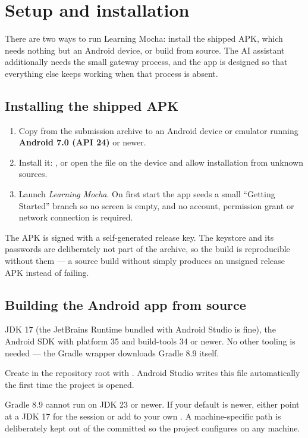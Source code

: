 \section{Setup and installation}
\label{sec:setup}

There are two ways to run Learning Mocha: install the shipped APK, which needs nothing but an Android
device, or build from source. The AI assistant additionally needs the small gateway process, and the app
is designed so that everything else keeps working when that process is absent.

\subsection{Installing the shipped APK}

\begin{enumerate}
  \item Copy  from the submission archive to an Android device or emulator
        running \textbf{Android 7.0 (API 24)} or newer.
  \item Install it: , or open the file on the device and allow
        installation from unknown sources.
  \item Launch \emph{Learning Mocha}. On first start the app seeds a small ``Getting Started'' branch so
        no screen is empty, and no account, permission grant or network connection is required.
\end{enumerate}

The APK is signed with a self-generated release key. The keystore and its passwords are deliberately not
part of the archive, so the build is reproducible without them --- a source build without
 simply produces an unsigned release APK instead of failing.

\subsection{Building the Android app from source}

\begin{description}[leftmargin=2.2em, style=nextline, font=\normalfont\bfseries]
  \item[Prerequisites] JDK 17 (the JetBrains Runtime bundled with Android Studio is fine), the Android
    SDK with platform 35 and build-tools 34 or newer. No other tooling is needed --- the Gradle wrapper
    downloads Gradle 8.9 itself.
  \item[SDK location] Create  in the repository root with
    . Android Studio writes this file automatically the first
    time the project is opened.
  \item[JDK selection] Gradle 8.9 cannot run on JDK 23 or newer. If your default  is newer,
    either point  at a JDK 17 for the session or add
     to your own .
    A machine-specific path is deliberately kept out of the committed  so the
    project configures on any machine.
\end{description}

